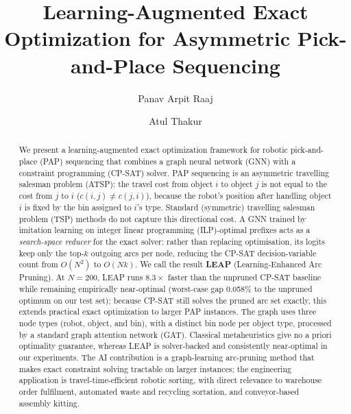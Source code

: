 \documentclass[review,times]{elsarticle}
\begin{document}
\begin{frontmatter}

\title{Learning-Augmented Exact Optimization for Asymmetric Pick-and-Place Sequencing}

\author[a]{Panav Arpit Raaj}
\author[a]{Atul Thakur}



\begin{abstract}
We present a learning-augmented exact optimization framework for robotic pick-and-place (PAP) sequencing that combines a graph neural network (GNN) with a constraint programming (CP-SAT) solver. PAP sequencing is an asymmetric travelling salesman problem (ATSP): the travel cost from object $i$ to object $j$ is not equal to the cost from $j$ to $i$ ($c(i,j)\neq c(j,i)$), because the robot's position after handling object $i$ is fixed by the bin assigned to $i$'s type. Standard (symmetric) travelling salesman problem (TSP) methods do not capture this directional cost. A GNN trained by imitation learning on integer linear programming (ILP)-optimal prefixes acts as a \emph{search-space reducer} for the exact solver: rather than replacing optimisation, its logits keep only the top-$k$ outgoing arcs per node, reducing the CP-SAT decision-variable count from $O(N^2)$ to $O(Nk)$. We call the result \textbf{LEAP} (Learning-Enhanced Arc Pruning). At $N{=}200$, LEAP runs $8.3\times$ faster than the unpruned CP-SAT baseline while remaining empirically near-optimal (worst-case gap 0.058\% to the unpruned optimum on our test set); because CP-SAT still solves the pruned arc set exactly, this extends practical exact optimization to larger PAP instances. The graph uses three node types (robot, object, and bin), with a distinct bin node per object type, processed by a standard graph attention network (GAT). Classical metaheuristics give no a priori optimality guarantee, whereas LEAP is solver-backed and consistently near-optimal in our experiments. The AI contribution is a graph-learning arc-pruning method that makes exact constraint solving tractable on larger instances; the engineering application is travel-time-efficient robotic sorting, with direct relevance to warehouse order fulfilment, automated waste and recycling sortation, and conveyor-based assembly kitting.
\end{abstract}


\end{frontmatter}
\end{document}
